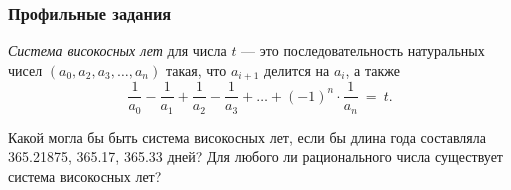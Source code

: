 \begin{frame} \frametitle{Профильные задания}
{\it Система високосных лет} для числа $t$ — это последовательность натуральных чисел $(a_0, a_2, a_3, \ldots, a_n)$ такая, что $a_{i+1}$ делится на $a_i$, а также
	$$\frac{1}{a_0} - \frac{1}{a_1} + \frac{1}{a_2} - \frac{1}{a_3} + \ldots
	     + (-1)^{n} \cdot \frac{1}{a_n}\ =\ t.$$ \smallskip

Какой могла бы быть система високосных лет, если бы длина года составляла 365.21875, 365.17, 365.33 дней? Для любого ли рационального числа существует система високосных лет?
\end{frame}
